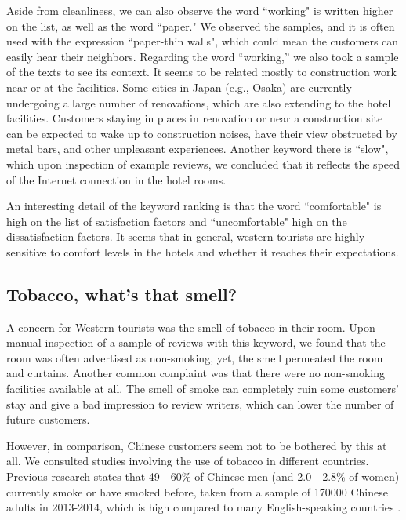\documentclass[smallextended,natbib]{svjour3}       %
\begin{document}
    Aside from cleanliness, we can also observe the word ``working" is written higher on the list, as well as the word ``paper." We observed the samples, and it is often used with the expression ``paper-thin walls", which could mean the customers can easily hear their neighbors. Regarding the word ``working,'' we also took a sample of the texts to see its context. It seems to be related mostly to construction work near or at the facilities. Some cities in Japan (e.g., Osaka) are currently undergoing a large number of renovations, which are also extending to the hotel facilities. Customers staying in places in renovation or near a construction site can be expected to wake up to construction noises, have their view obstructed by metal bars, and other unpleasant experiences. Another keyword there is ``slow", which upon inspection of example reviews, we concluded that it reflects the speed of the Internet connection in the hotel rooms.

    An interesting detail of the keyword ranking is that the word ``comfortable" is high on the list of satisfaction factors and ``uncomfortable" high on the dissatisfaction factors. It seems that in general, western tourists are highly sensitive to comfort levels in the hotels and whether it reaches their expectations.


  \subsection{Tobacco, what's that smell?}\label{disc:tobacco}

    A concern for Western tourists was the smell of tobacco in their room. Upon manual inspection of a sample of reviews with this keyword, we found that the room was often advertised as non-smoking, yet, the smell permeated the room and curtains. Another common complaint was that there were no non-smoking facilities available at all. The smell of smoke can completely ruin some customers' stay and give a bad impression to review writers, which can lower the number of future customers. 

    However, in comparison, Chinese customers seem not to be bothered by this at all. We consulted studies involving the use of tobacco in different countries. Previous research states that 49 - 60\% of Chinese men (and 2.0 - 2.8\% of women) currently smoke or have smoked before, taken from a sample of \num[group-separator={,}]{170000} Chinese adults in 2013-2014, which is high compared to many English-speaking countries \cite[][]{zhang2019tobacco, who2015tobacco}.
\end{document}
